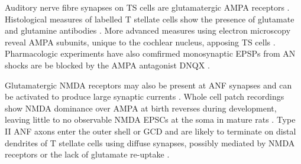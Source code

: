 
 Auditory nerve fibre synapses on TS cells are glutamatergic AMPA receptors
 \citep{FerragamoGoldingEtAl:1998a,WentholdHunterEtAl:1993}.  Histological measures
 of labelled T stellate cells show the presence of glutamate and glutamine antibodies
 \citep{HackneyOsenEtAl:1990,WentholdHunterEtAl:1993}.  More advanced measures using
 electron microscopy reveal AMPA subunits, unique to the cochlear nucleus, apposing
 TS cells \citep{WangWentholdEtAl:1998}.  Pharmacologic experiments have also
 comfirmed monosynaptic EPSPs from AN shocks are be blocked by the AMPA antagonist
 DNQX \citep{FerragamoGoldingEtAl:1998a}.


 Glutamatergic NMDA receptors may also be present at ANF synapses
 \citep[mice][]{FerragamoGoldingEtAl:1998a} and can be activated to produce large
 synaptic currents \citep{CaoOertel:2010}.  Whole cell patch recordings show NMDA
 dominance over AMPA at birth reverses during development, leaving little to no
 observable NMDA EPSCs at the soma in mature rats \citep{BellinghamLimEtAl:1998}.
 Type II ANF axons enter the outer shell or GCD and are likely to terminate on distal
 dendrites of T stellate cells using diffuse synapses, possibly mediated by NMDA
 receptors or the lack of glutamate re-uptake
 \citep{BensonBrown:2004,Ryugo:2008,RyugoHaenggeliEtAl:2003,RyugoParks:2003}.


